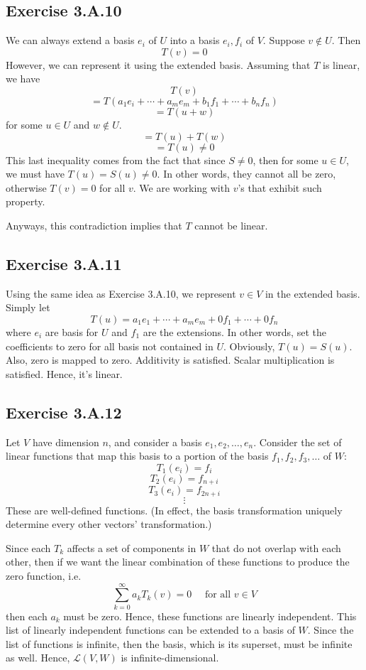 \documentclass{book}
\begin{document}
\subsection*{Exercise 3.A.10}
We can always extend a basis $e_i$ of $U$ into a basis $e_i, f_i$ of $V$. Suppose $v \not \in U$. Then
$$T(v) = 0$$
However, we can represent it using the extended basis. Assuming that $T$ is linear, we have
$$T(v)$$
$$= T(a_1 e_i + \cdots + a_m e_m + b_1 f_1 + \cdots + b_n f_n)$$
$$= T(u + w)$$
for some $u \in U$ and $w \not \in U$.
$$= T(u) + T(w)$$
$$= T(u) \neq 0$$
This last inequality comes from the fact that since $S \neq 0$, then for some $u \in U$, we must have $T(u) = S(u) \neq 0$. In other words, they cannot all be zero, otherwise $T(v) = 0$ for all $v$. We are working with $v$'s that exhibit such property.

Anyways, this contradiction implies that $T$ cannot be linear.

\subsection*{Exercise 3.A.11}
Using the same idea as Exercise 3.A.10, we represent $v \in V$ in the extended basis. Simply let
$$T(u) = a_1 e_1 + \cdots + a_m e_m + 0 f_1 + \cdots + 0 f_n$$
where $e_i$ are basis for $U$ and $f_1$ are the extensions. In other words, set the coefficients to zero for all basis not contained in $U$. Obviously, $T(u) = S(u)$. Also, zero is mapped to zero. Additivity is satisfied. Scalar multiplication is satisfied. Hence, it's linear.

\subsection*{Exercise 3.A.12}
Let $V$ have dimension $n$, and consider a basis $e_1, e_2, \ldots, e_n$. Consider the set of linear functions that map this basis to a portion of the basis $f_1, f_2, f_3, \ldots$ of $W$:
$$T_1 (e_i) = f_i$$
$$T_2 (e_i) = f_{n + i}$$
$$T_3 (e_i) = f_{2n + i}$$
$$\vdots$$
These are well-defined functions. (In effect, the basis transformation uniquely determine every other vectors' transformation.)

Since each $T_k$ affects a set of components in $W$ that do not overlap with each other, then if we want the linear combination of these functions to produce the zero function, i.e.
$$\sum_{k = 0}^\infty a_k T_k (v) = 0 \quad \text{ for all } v \in V$$
then each $a_k$ must be zero. Hence, these functions are linearly independent. This list of linearly independent functions can be extended to a basis of $W$. Since the list of functions is infinite, then the basis, which is its superset, must be infinite as well. Hence, $\mathcal{L}(V, W)$ is infinite-dimensional.
\end{document}
